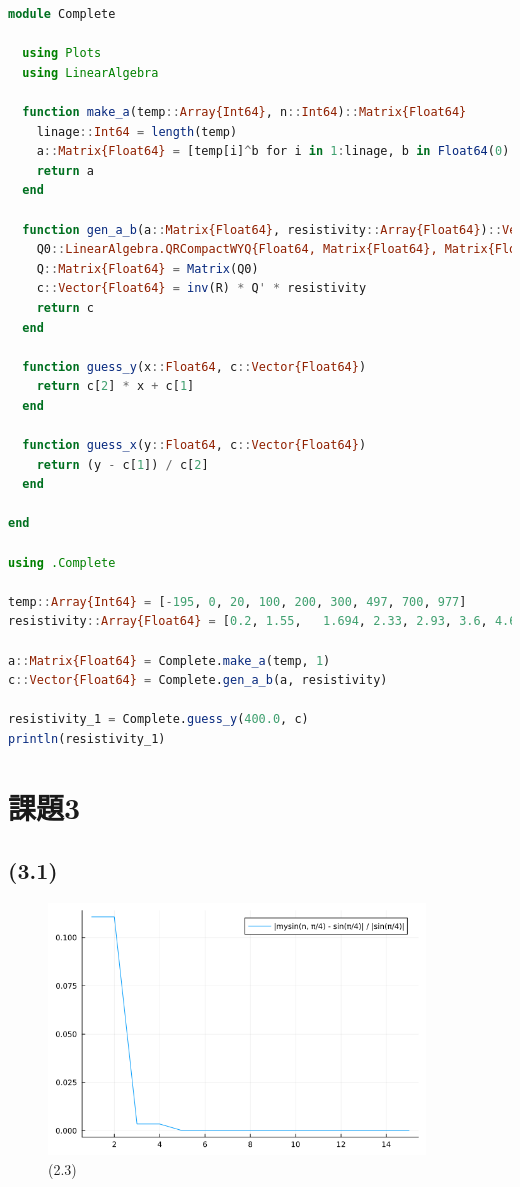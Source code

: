 \documentclass[uplatex, dvipdfmx, a4j,11pt]{jsarticle}
\begin{document}
\begin{lstlisting}[title={(2.4-2)}, label=code:in, language=Julia]
  module Complete

  using Plots
  using LinearAlgebra

  function make_a(temp::Array{Int64}, n::Int64)::Matrix{Float64}
    linage::Int64 = length(temp)
    a::Matrix{Float64} = [temp[i]^b for i in 1:linage, b in Float64(0):Float64(n)]
    return a
  end

  function gen_a_b(a::Matrix{Float64}, resistivity::Array{Float64})::Vector{Float64}
    Q0::LinearAlgebra.QRCompactWYQ{Float64, Matrix{Float64}, Matrix{Float64}}, R::Matrix{Float64} = LinearAlgebra.qr(a)
    Q::Matrix{Float64} = Matrix(Q0)
    c::Vector{Float64} = inv(R) * Q' * resistivity
    return c
  end

  function guess_y(x::Float64, c::Vector{Float64})
    return c[2] * x + c[1]
  end

  function guess_x(y::Float64, c::Vector{Float64})
    return (y - c[1]) / c[2]
  end

end

using .Complete

temp::Array{Int64} = [-195, 0, 20, 100, 200, 300, 497, 700, 977]
resistivity::Array{Float64} = [0.2,	1.55,	1.694, 2.33, 2.93, 3.6, 4.6, 6.7, 8.1]

a::Matrix{Float64} = Complete.make_a(temp, 1)
c::Vector{Float64} = Complete.gen_a_b(a, resistivity)

resistivity_1 = Complete.guess_y(400.0, c)
println(resistivity_1)
\end{lstlisting}

\newpage
\section*{課題3}
\subsection*{(3.1)}
\begin{figure}[h]
  \begin{center}
    \includegraphics[width=100mm]{mysin.png}
    \caption{(2.3)}
  \end{center}
\end{figure}
\end{document}
